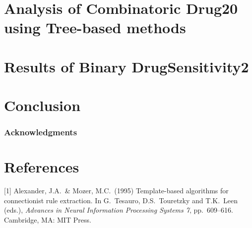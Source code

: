 \documentclass{article}
\begin{document}
\section{Analysis of Combinatoric Drug20 using Tree-based methods}
\label{combodrug}

\section{Results of Binary DrugSensitivity2}
\label{drug2}

\section{Conclusion}
\label{con}

\subsubsection*{Acknowledgments}
\section*{References}
\small
[1] Alexander, J.A.\ \& Mozer, M.C.\ (1995) Template-based algorithms
for connectionist rule extraction. In G.\ Tesauro, D.S.\ Touretzky and
T.K.\ Leen (eds.), {\it Advances in Neural Information Processing
  Systems 7}, pp.\ 609--616. Cambridge, MA: MIT Press.
\end{document}
